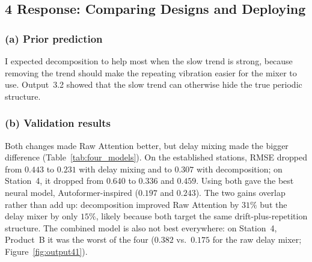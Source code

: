 \documentclass[a4, 12pt]{article}
\begin{document}
\subsection{4 Response: Comparing Designs and Deploying}

\subsubsection{(a) Prior prediction}

I expected decomposition to help most when the slow trend is strong, because
removing the trend should make the repeating vibration easier for the mixer to
use. Output~3.2 showed that the slow trend can otherwise hide the true periodic
structure.




\subsubsection{(b) Validation results}
Both changes made Raw Attention better, but delay mixing made the bigger
difference (Table~\ref{tab:four_models}). On the established stations, RMSE
dropped from $0.443$ to $0.231$ with delay mixing and to $0.307$ with
decomposition; on Station~4, it dropped from $0.640$ to $0.336$ and $0.459$.
Using both gave the best neural model, Autoformer-inspired ($0.197$ and
$0.243$). The two gains overlap rather than add up: decomposition improved Raw
Attention by $31\%$ but the delay mixer by only $15\%$, likely because both
target the same drift-plus-repetition structure. The combined model is also not
best everywhere: on Station~4, Product~B it was the worst of the four ($0.382$
vs.\ $0.175$ for the raw delay mixer; Figure~\ref{fig:output41}).
\end{document}
